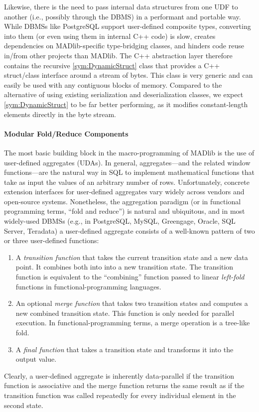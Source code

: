 Likewise, there is the need to pass internal data structures from one UDF to another (i.e., possibly through the DBMS) in a performant and portable way. While DBMSs like PostgreSQL support user-defined composite types, converting into them (or even using them in internal C++ code) is slow, creates dependencies on MADlib-specific type-bridging classes, and hinders code reuse in/from other projects than MADlib. The C++ abstraction layer therefore contains the recursive \ref{sym:DynamicStruct} class that provides a C++ struct/class interface around a stream of bytes. This class is very generic and can easily be used with any contiguous blocks of memory. Compared to the alternative of using existing serialization and deserialization classes, we expect \ref{sym:DynamicStruct} to be far better performing, as it modifies constant-length elements directly in the byte stream.

\paragraph{Modular Fold/Reduce Components}

The most basic building block in the macro-programming of MADlib is the use of user-defined aggregates (UDAs). In general, aggregates---and the related window functions---are the natural way in SQL to implement mathematical functions that take as input the values of an arbitrary number of rows. Unfortunately, concrete extension interfaces for user-defined aggregates vary widely across vendors and open-source systems. Nonetheless, the aggregation paradigm (or in functional programming terms, ``fold and reduce'') is natural and ubiquitous, and in most widely-used DBMSs (e.g., in PostgreSQL, MySQL, Greengage, Oracle, SQL Server, Teradata) a user-defined aggregate consists of a well-known pattern of two or three user-defined functions:
\begin{enumerate}
	\item A \emph{transition function} that takes the current transition state and a new data point. It combines both into into a new transition state. The transition function is equivalent to the ``combining'' function passed to linear \emph{left-fold} functions in functional-programming languages.
	\item An optional \emph{merge function} that takes two transition states and computes a new combined transition state. This function is only needed for parallel execution. In functional-programming terms, a merge operation is a tree-like fold.
	\item A \emph{final function} that takes a transition state and transforms it into the output value.
\end{enumerate}
Clearly, a user-defined aggregate is inherently data-parallel if the transition function is associative and the merge function returns the same result as if the transition function was called repeatedly for every individual element in the second state.

